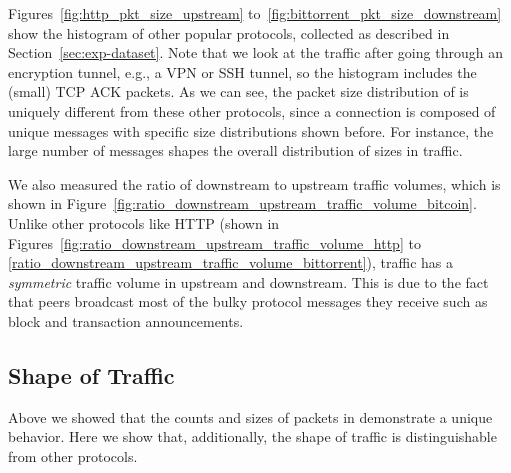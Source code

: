 Figures~\ref{fig:http_pkt_size_upstream} to~\ref{fig:bittorrent_pkt_size_downstream}  show the histogram of other popular protocols, collected as described in Section~\ref{sec:exp-dataset}. Note that we look at the traffic after going through an encryption tunnel, e.g., a VPN or SSH tunnel, so the histogram includes the (small) TCP ACK packets. 
As we can see, 
the packet size distribution of \bc is uniquely different from these other protocols, since a \bc connection is composed of unique messages with specific size distributions shown before. For instance, the large number of  messages shapes the overall distribution of sizes in \bc traffic. 

 

We also measured the ratio of downstream to upstream traffic volumes, which is shown in Figure~\ref{fig:ratio_downstream_upstream_traffic_volume_bitcoin}.
Unlike other protocols like HTTP (shown in
Figures~\ref{fig:ratio_downstream_upstream_traffic_volume_http} to \ref{ratio_downstream_upstream_traffic_volume_bittorrent}),
\bc traffic has a \emph{symmetric} traffic volume in upstream and downstream. 
This is due to the fact that \bc peers broadcast most of the bulky protocol messages they receive such as block and transaction announcements. 


\subsection{Shape of Traffic}\label{sec:shape_of_traffic}

Above we showed that the counts and sizes of packets in \bc demonstrate a unique behavior. 
Here we show that, additionally, the shape of \bc traffic is distinguishable from other protocols.


